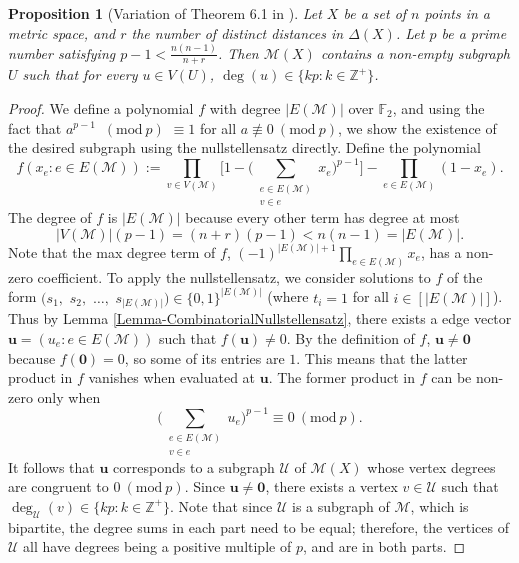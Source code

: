 \documentclass[12pt]{article}
\newcommand{\Z}{\mathbb{Z}}
\newcommand{\Mod}[1]{\ (\mathrm{mod}\ #1)}
\newtheorem{prop}[thm]{Proposition}
\theoremstyle{definition}
\begin{document}
	\begin{prop}[Variation of Theorem 6.1 in \cite{alon}]\label{Prop-SubgraphNullstellensatzResult}
		Let $X$ be a set of $n$ points in a metric space, and $r$ the number of distinct distances in $\Delta(X)$.  Let $p$ be a prime number satisfying $p-1 < \tfrac{n(n-1)}{n+r}$.  Then $\mathcal{M}(X)$ contains a non-empty subgraph $U$ such that for every $u \in V(U)$, $\deg(u) \in \{kp: k \in \Z^+\}$.  %
	\end{prop}
	\begin{proof}
		We define a polynomial $f$ with degree $|E(\mathcal{M})|$ over $\mathbb{F}_2$, and using the fact that $a^{p-1}$ $\Mod{p}$ $\equiv 1$ for all $a \not\equiv 0 \Mod{p}$, we show the existence of the desired subgraph using the nullstellensatz directly.
		Define the polynomial
		$$f(x_e:e \in E(\mathcal{M})) := \prod_{v \in V(\mathcal{M})} \biggr[1 - \Big(\sum_{\substack{e \in E(\mathcal{M})\\ v \in e}}x_e \Big)^{p-1} \biggr] - \prod_{e \in E(\mathcal{M})}(1-x_e).$$
		The degree of $f$ is $|E(\mathcal{M})|$ because every other term has degree at most
		$$|V(\mathcal{M})| (p-1) = (n+r)(p-1) < n(n-1) = |E(\mathcal{M})|.$$
		Note that the max degree term of $f$, $(-1)^{|E(\mathcal{M})|+1}\prod_{e \in E(\mathcal{M})} x_e$, has a non-zero coefficient. 
		To apply the nullstellensatz, we consider solutions to $f$ of the form $(s_1,$ $s_2,$ $\ldots,$ $s_{|E(\mathcal{M})|}) \in \{0,1\}^{|E(\mathcal{M})|}$ (where $t_i = 1$ for all $i \in [|E(\mathcal{M})|]$).  Thus by Lemma \ref{Lemma-CombinatorialNullstellensatz}, there exists a edge vector $\mathbf{u}=(u_e:e \in E(\mathcal{M}))$ such that $f(\mathbf{u}) \neq 0$.  By the definition of $f$, $\mathbf{u} \neq \mathbf{0}$ because $f(\mathbf{0}) = 0$, so some of its entries are $1$.  This means that the latter product in $f$ vanishes when evaluated at $\mathbf{u}$.  The former product in $f$ can be non-zero only when
		$$\Big(\sum_{\substack{e \in E(\mathcal{M})\\ v \in e}}u_e \Big)^{p-1} \equiv 0 \Mod{p}.$$  
		It follows that $\mathbf{u}$ corresponds to a subgraph $\mathcal{U}$ of $\mathcal{M}(X)$ whose vertex degrees are congruent to $0 \Mod{p}$.  Since $\mathbf{u} \neq \mathbf{0}$, there exists a vertex $v \in \mathcal{U}$ such that $\deg_{\mathcal{U}}(v) \in \{kp: k \in \Z^+\}$.  Note that since $\mathcal{U}$ is a subgraph of $\mathcal{M}$, which is bipartite, the degree sums in each part need to be equal; therefore, the vertices of $\mathcal{U}$ all have degrees being a positive multiple of $p$, and are in both parts. \qedhere
	\end{proof}
	
\end{document}
